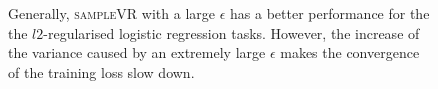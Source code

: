 \documentclass[letterpaper]{article}
\begin{document}
\begin{figure}[t]
\centering
{}
\caption{Generally, \textsc{sampleVR} with a large $\epsilon$ has a better performance for the the $l2$-regularised logistic regression tasks. However,  the increase of the variance caused by an extremely large $\epsilon$ makes the convergence of the training loss slow down.}
\label{figure_logistic_regression_rho}
\end{figure}
\end{document}
